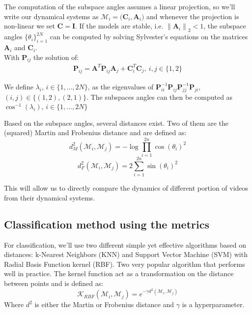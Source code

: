 \documentclass[twocolumn,10pt]{asme2ej}
\newcommand{\norm}[1]{\left\lVert#1\right\rVert}
\begin{document}
The computation of the subspace angles assumes a linear projection, so we'll write our dynamical systems as $\mathcal{M}_i = \big( \bm C_i, \bm A_i)$ and whenever the projection is non-linear we set $\bm C=\bm I$. If the models are stable, i.e. $\norm{\bm A_i}_2 < 1$, the subspace angles $\{\theta_i\}_{i=1}^{2N}$ can be computed by solving Sylvester's equations on the matrices $\bm A_i$ and $\bm C_i$. \\
With $\bm P_{ij}$ the solution of:
\begin{gather*}
    \bm P_{ij} = \bm A^T\bm P_{ij} \bm A_j + \bm C_i^T \bm C_j,\ i,j \in \{1,2\}
\end{gather*}

We define $\lambda_i$, $i \in \{1,\dots,2N\}$, as the eigenvalues of $\bm P_{ii}^{-1}\bm P_{ij}\bm P_{jj}^{-1}\bm P_{ji}$, $(i,j) \in \{(1,2),(2,1)\}$. The subspaces angles can then be computed as $\cos^{-1}{(\lambda_i)},\, i\in \{1,\dots,2N\}$

Based on the subspace angles, several distances exist. Two of them are the (squared) Martin and Frobenius distance and are defined as:
\begin{equation}
    d_M^2(\mathcal{M}_i, \mathcal{M}_j) = -\log\prod_{i=1}^{2n}\cos{(\theta_i)}^2
\end{equation}
\begin{equation}
    d_F^2(\mathcal{M}_i, \mathcal{M}_j) = 2\sum_{i=1}^{2n}\sin{(\theta_i)}^2
\end{equation}

This will allow us to directly compare the dynamics of different portion of videos from their dynamical systems.

\subsection{Classification method using the metrics}
\label{section:classification}
For classification, we'll use two different simple yet effective algorithms based on distances: k-Nearest Neighbors (KNN) and Support Vector Machine (SVM) with Radial Basis Function kernel (RBF). Two very popular algorithm that performs well in practice. The kernel function act as a transformation on the distance between points and is defined as:
\begin{equation}
    \mathcal{K}_{RBF}(\mathcal{M}_i, \mathcal{M}_j) = e^{-\gamma d^2(\mathcal{M}_i, \mathcal{M}_j)}
\end{equation}
Where $d^2$ is either the Martin or Frobenius distance and $\gamma$ is a hyperparameter.
\end{document}
